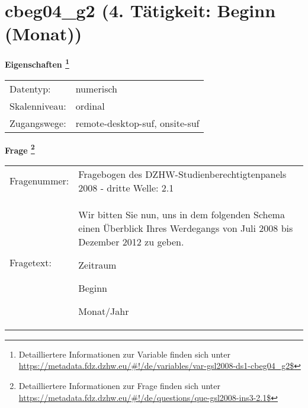 
    \setcounter{footnote}{0}

    \vspace*{-1.8cm}
	\section{cbeg04\_g2 (4. Tätigkeit: Beginn (Monat))}
	\label{section:cbeg04_g2}



    \vspace*{0.5cm}
    \noindent\textbf{Eigenschaften
	\footnote{Detailliertere Informationen zur Variable finden sich unter
		\url{https://metadata.fdz.dzhw.eu/\#!/de/variables/var-gsl2008-ds1-cbeg04_g2$}}}\\
	\begin{tabularx}{\hsize}{@{}lX}
	Datentyp: & numerisch \\
	Skalenniveau: & ordinal \\
	Zugangswege: &
	  remote-desktop-suf, 
	  onsite-suf
 \\
    \end{tabularx}



				\vspace*{0.5cm}
                \noindent\textbf{Frage
	                \footnote{Detailliertere Informationen zur Frage finden sich unter
		              \url{https://metadata.fdz.dzhw.eu/\#!/de/questions/que-gsl2008-ins3-2.1$}}}\\
				\begin{tabularx}{\hsize}{@{}lX}
					Fragenummer: &
					  Fragebogen des DZHW-Studienberechtigtenpanels 2008 - dritte Welle:
					  2.1
 \\
					Fragetext: & Wir bitten Sie nun, uns in dem folgenden Schema einen Überblick Ihres Werdegangs von Juli 2008 bis Dezember 2012 zu geben.\par  Zeitraum\par  Beginn\par  Monat/Jahr \\
				\end{tabularx}





